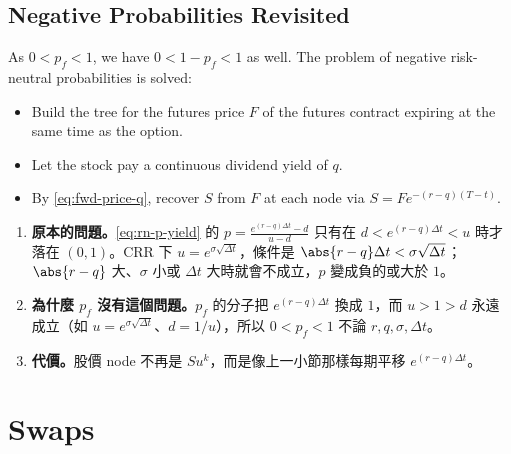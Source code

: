 \subsection{Negative Probabilities Revisited}


As $0<p_{f}<1$, we have $0<1-p_{f}<1$ as well.
The problem of negative risk-neutral probabilities is solved:
\begin{itemize}[nosep]
	\item Build the tree for the futures price $F$ of the futures contract expiring at the same time as the option.
	\item Let the stock pay a continuous dividend yield of $q$.
	\item By \eqref{eq:fwd-price-q}, recover $S$ from $F$ at each node via $S=Fe^{-(r-q)(T-t)}$.
\end{itemize}

\suppstart
{}

\begin{remark}
	\begin{enumerate}[(1),nosep]
		\item \textbf{原本的問題。}\eqref{eq:rn-p-yield} 的 $p=\frac{e^{(r-q)\Delta t}-d}{u-d}$ 只有在 $d<e^{(r-q)\Delta t}<u$ 時才落在 $(0,1)$。CRR 下 $u=e^{\sigma\sqrt{\Delta t}}$，條件是 $\abs{r-q}\Delta t<\sigma\sqrt{\Delta t}$；$\abs{r-q}$ 大、$\sigma$ 小或 $\Delta t$ 大時就會不成立，$p$ 變成負的或大於 $1$。
		\item \textbf{為什麼 $p_{f}$ 沒有這個問題。}$p_{f}$ 的分子把 $e^{(r-q)\Delta t}$ 換成 $1$，而 $u>1>d$ 永遠成立（如 $u=e^{\sigma\sqrt{\Delta t}}$、$d=1/u$），所以 $0<p_{f}<1$ 不論 $r,q,\sigma,\Delta t$。
		\item \textbf{代價。}股價 node 不再是 $Su^{k}$，而是像上一小節那樣每期平移 $e^{(r-q)\Delta t}$。
	\end{enumerate}
\end{remark}
\suppend

\section{Swaps}
\label{sec:swaps}


